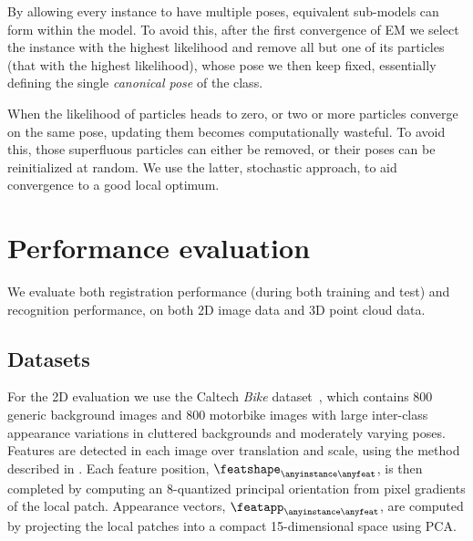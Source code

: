 By allowing every instance to have multiple poses, equivalent sub-models can form within the model. To avoid this, after the first convergence of EM we select the instance with the highest likelihood and remove all but one of its particles (that with the highest likelihood), whose pose we then keep fixed, essentially defining the single \emph{canonical pose} of the class.

When the likelihood of particles heads to zero, or two or more particles converge on the same pose, updating them becomes computationally wasteful. To avoid this, those superfluous particles can either be removed, or their poses can be reinitialized at random. We use the latter, stochastic approach, to aid convergence to a good local optimum.


\section{Performance evaluation}
\label{sec:experiments}
We evaluate both registration performance (during both training and test) and recognition performance, on both 2D image data and 3D point cloud data.

\subsection{Datasets}
For the 2D evaluation we use the Caltech \emph{Bike} dataset~\cite{ComputationalVisionLab2001}, which contains 800 generic background images and 800 motorbike images with large inter-class appearance variations in cluttered backgrounds and moderately varying poses. Features are detected in each image over translation and scale, using the method described in \cite{Fergus2007}. Each feature position, $\featshape_{\anyinstance\anyfeat}$, is then completed by computing an $8$-quantized principal orientation from pixel gradients of the local patch. Appearance vectors, $\featapp_{\anyinstance\anyfeat}$, are computed by projecting the local patches into a compact 15-dimensional space using PCA.  

